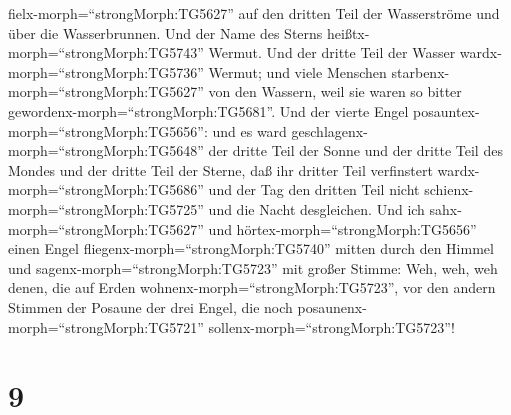 fielx-morph=``strongMorph:TG5627'' auf den dritten Teil der Wasserströme
und über die Wasserbrunnen.  Und der Name des Sterns
heißtx-morph=``strongMorph:TG5743'' Wermut. Und der dritte Teil der
Wasser wardx-morph=``strongMorph:TG5736'' Wermut; und viele Menschen
starbenx-morph=``strongMorph:TG5627'' von den Wassern, weil sie waren so
bitter gewordenx-morph=``strongMorph:TG5681''.  Und der
vierte Engel posauntex-morph=``strongMorph:TG5656'': und es ward
geschlagenx-morph=``strongMorph:TG5648'' der dritte Teil der Sonne und
der dritte Teil des Mondes und der dritte Teil der Sterne, daß ihr
dritter Teil verfinstert wardx-morph=``strongMorph:TG5686'' und der Tag
den dritten Teil nicht schienx-morph=``strongMorph:TG5725'' und die
Nacht desgleichen.  Und ich
sahx-morph=``strongMorph:TG5627'' und
hörtex-morph=``strongMorph:TG5656'' einen Engel
fliegenx-morph=``strongMorph:TG5740'' mitten durch den Himmel und
sagenx-morph=``strongMorph:TG5723'' mit großer Stimme: Weh, weh, weh
denen, die auf Erden wohnenx-morph=``strongMorph:TG5723'', vor den
andern Stimmen der Posaune der drei Engel, die noch
posaunenx-morph=``strongMorph:TG5721''
sollenx-morph=``strongMorph:TG5723''!

\hypertarget{section-8}{%
\section{9}\label{section-8}}

